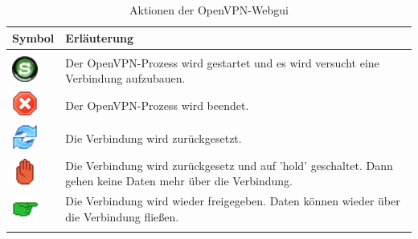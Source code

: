 \begin{description}
  \begin{table}[!h]
    \begin{tabular}{lp{12cm}}
      Symbol                                         & Erläuterung \\
      \hline                                                            \\
      \includegraphics[width=24pt]{start}            & Der OpenVPN-Prozess wird gestartet und es wird versucht eine Verbindung aufzubauen.        \\
      \includegraphics[width=24pt]{stop}             & Der OpenVPN-Prozess wird beendet. \\
      \includegraphics[width=24pt]{reload}           & Die Verbindung wird zurückgesetzt. \\
      \includegraphics[width=24pt]{hold}             & Die Verbindung wird zurückgesetz und auf 'hold' geschaltet. Dann gehen keine Daten mehr über die Verbindung. \\
      \includegraphics[width=24pt]{release}          & Die Verbindung wird wieder freigegeben. Daten können wieder über die Verbindung fließen.  \\
      \hline                                                            \\
    \end{tabular}
  \caption{Aktionen der OpenVPN-Webgui}
\end{table}
\end{description}

